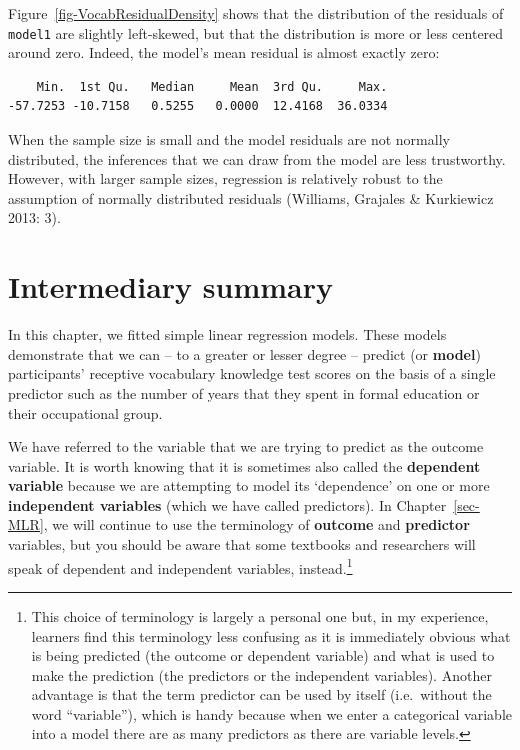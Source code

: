 \documentclass[
  letterpaper,
  DIV=11,
  numbers=noendperiod]{scrreprt}
\newenvironment{Shaded}{\begin{snugshade}}{\end{snugshade}}
\newcommand{\FunctionTok}[1]{\textcolor[rgb]{0.28,0.35,0.67}{#1}}
\newcommand{\NormalTok}[1]{\textcolor[rgb]{0.00,0.23,0.31}{#1}}
\newcommand{\SpecialCharTok}[1]{\textcolor[rgb]{0.37,0.37,0.37}{#1}}
\begin{document}
Figure~\ref{fig-VocabResidualDensity} shows that the distribution of the
residuals of \texttt{model1} are slightly left-skewed, but that the
distribution is more or less centered around zero. Indeed, the model's
mean residual is almost exactly zero:

\begin{Shaded}
\end{Shaded}

\begin{verbatim}
    Min.  1st Qu.   Median     Mean  3rd Qu.     Max. 
-57.7253 -10.7158   0.5255   0.0000  12.4168  36.0334 
\end{verbatim}

When the sample size is small and the model residuals are not normally
distributed, the inferences that we can draw from the model are less
trustworthy. However, with larger sample sizes, regression is relatively
robust to the assumption of normally distributed residuals (Williams,
Grajales \& Kurkiewicz 2013: 3).

\section{Intermediary summary}\label{sec-IntSummary}

In this chapter, we fitted simple linear regression models. These models
demonstrate that we can -- to a greater or lesser degree -- predict (or
\textbf{model}) participants' receptive vocabulary knowledge test scores
on the basis of a single predictor such as the number of years that they
spent in formal education or their occupational group.

We have referred to the variable that we are trying to predict as the
outcome variable. It is worth knowing that it is sometimes also called
the \textbf{dependent variable} because we are attempting to model its
`dependence' on one or more \textbf{independent variables} (which we
have called predictors). In Chapter~\ref{sec-MLR}, we will continue to
use the terminology of \textbf{outcome} and \textbf{predictor}
variables, but you should be aware that some textbooks and researchers
will speak of dependent and independent variables, instead.\footnote{This
  choice of terminology is largely a personal one but, in my experience,
  learners find this terminology less confusing as it is immediately
  obvious what is being predicted (the outcome or dependent variable)
  and what is used to make the prediction (the predictors or the
  independent variables). Another advantage is that the term predictor
  can be used by itself (i.e.~without the word ``variable''), which is
  handy because when we enter a categorical variable into a model there
  are as many predictors as there are variable levels.}
\end{document}
